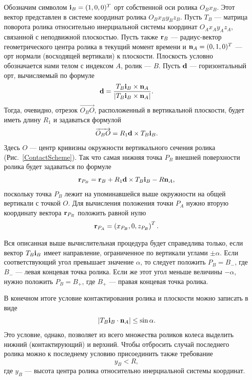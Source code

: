 Обозначим символом ${\bf i}_B=(1,0,0)^T$ орт собственной оси ролика $O_Bx_B$.
Этот вектор представлен в системе координат ролика $O_Bx_By_Bz_B$. Пусть $T_B$
--- матрица поворота ролика относительно инерциальной системы координат 
$O_Ax_Ay_Az_A$, связанной с неподвижной плоскостью. Пусть также ${\bf r}_B$ ---
радиус-вектор геометрического центра ролика в текущий момент времени и 
${\bf n}_A=(0,1,0)^T$ --- орт нормали (восходящей вертикали) к плоскости. 
Плоскость условно обозначается нами телом с индексом $A$, ролик --- $B$. Пусть
${\bf d}$ --- горизонтальный орт, вычисляемый по формуле
$$
{\bf d}=\dfrac{T_B{\bf i}_B\times {\bf n}_A}
              {\left| T_B{\bf i}_B\times {\bf n}_A\right|}.
$$
Тогда, очевидно, отрезок $\overrightarrow{O_BO}$, расположенный в вертикальной
плоскости, будет иметь длину $R_1$ и задаваться формулой
$$
\overrightarrow{O_BO}=R_1{\bf d}\times T_B{\bf i}_B.
$$
Здесь $O$ --- центр кривизны окружности вертикального сечения ролика 
(Рис.~\ref{ContactScheme}). Так что самая нижняя точка $P_B$ внешней 
поверхности ролика будет задаваться по формуле
\begin{equation}
{\bf r}_{P_B}={\bf r}_B+R_1{\bf d}\times T_B{\bf i}_B-R{\bf n}_A,
\label{3_2_0}
\end{equation}
поскольку точка $P_B$ лежит на упоминавшейся выше окружности на общей вертикали 
с точкой $O$. Для вычисления положения точки $P_A$ нужно вторую координату 
вектора ${\bf r}_{P_B}$ положить равной нулю
\begin{equation}
{\bf r}_{P_A}=\left( x_{P_B},0,z_{P_B}\right) ^T.
\label{3_2_1}
\end{equation}

Вся описанная выше вычислительная процедура будет справедлива только, если 
вектор $T_B{\bf i}_B$ имеет направление, ограниченное по вертикали углами
$\pm\alpha $. Если соответствующий угол превышает значение $\alpha $, то 
следует положить $P_B=B_{-}$, где $B_{-}$ --- левая концевая точка ролика. Если
же этот угол меньше величины $-\alpha $, нужно положить $P_B=B_{+}$, где 
$B_{+}$ --- правая концевая точка ролика.

В конечном итоге условие контактирования ролика и плоскости можно записать в 
виде
\begin{equation}
\left| T_B{\bf i}_B\cdot {\bf n}_A\right|\le\sin\alpha .
\label{3_2}
\end{equation}
Это условие, однако, позволяет из всего множества роликов колеса выделить 
нижний (контактирующий) и верхний. Чтобы отбросить случай последнего ролика
можно к последнему условию присоединить также требование 
\begin{equation}
y_B<R,
\label{3_3}
\end{equation}
где $y_B$ --- высота центра ролика относительно инерциальной системы координат.

